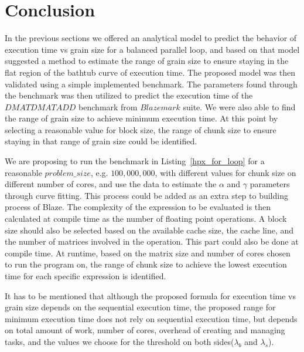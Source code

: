 \section{Conclusion}
In the previous sections we offered an analytical model to predict the behavior of execution time vs grain size for a balanced parallel loop, and based on that model suggested a method to estimate the range of grain size to ensure staying in the flat region of the bathtub curve of execution time. The proposed model was then validated using a simple implemented benchmark. The parameters found through the benchmark was then utilized to predict the execution time of the $DMATDMATADD$ benchmark from $Blazemark$ suite. We were also able to find the range of grain size to achieve minimum execution time. 
At this point by selecting a reasonable value for block size, the range of chunk size to ensure staying in that range of grain size could be identified.

We are proposing to run the benchmark in Listing~\ref{hpx_for_loop} for a reasonable $problem\_{size}$, e.g. $100,000,000$, with different values for chunk size on different number of cores, and use the data to estimate the $\alpha$ and $\gamma$ parameters through curve fitting. This process could be added as an extra step to building process of Blaze. 
The complexity of the expression to be evaluated is then calculated at compile time as the number of floating point operations. A block size should also be selected based on the available cache size, the cache line, and the number of matrices involved in the operation. This part could also be done at compile time.   
At runtime, based on the matrix size and number of cores chosen to run the program on, the range of chunk size to achieve the lowest execution time for each specific expression is identified.

It has to be mentioned that although the proposed formula for execution time vs grain size depends on the sequential execution time, the proposed range for minimum execution time does not rely on sequential execution time, but depends on total amount of work, number of cores, overhead of creating and managing tasks, and the values we choose for the threshold on both sides($\lambda_{b}$ and $\lambda_{s}$).
 





